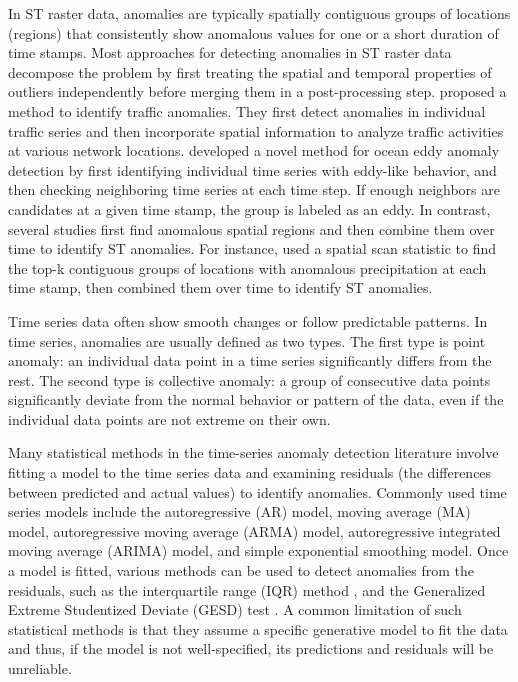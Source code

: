 \documentclass[11pt]{article}
\begin{document}
In ST raster data, anomalies are typically spatially contiguous groups of locations (regions) that consistently show anomalous values for one or a short duration of time stamps. Most approaches for detecting anomalies in ST raster data decompose the problem by first treating the spatial and temporal properties of outliers independently before merging them in a post-processing step. \citet{paschalidis2008spatio} proposed a method to identify traffic anomalies. They first detect anomalies in individual traffic series and then incorporate spatial information to analyze traffic activities at various network locations. \citet{faghmous2012novel} developed a novel method for ocean eddy anomaly detection by first identifying individual time series with eddy-like behavior, and then checking neighboring time series at each time step. If enough neighbors are candidates at a given time stamp, the group is labeled as an eddy. In contrast, several studies first find anomalous spatial regions and then combine them over time to identify ST anomalies. For instance, \citet{wu2010spatio} used a spatial scan statistic to find the top-k contiguous groups of locations with anomalous precipitation at each time stamp, then combined them over time to identify ST anomalies.





Time series data often show smooth changes or follow predictable patterns. In time series, anomalies are usually defined as two types. The first type is point anomaly: an individual data point in a time series significantly differs from the rest. The second type is collective anomaly: a group of consecutive data points significantly deviate from the normal behavior or pattern of the data, even if the individual data points are not extreme on their own. 

Many statistical methods in the time-series anomaly detection literature involve fitting a model to the time series data and examining residuals (the differences between predicted and actual values) to identify anomalies. Commonly used time series models include the autoregressive (AR) model, moving average (MA) model, autoregressive moving average (ARMA) model, autoregressive integrated moving average (ARIMA) model, and simple exponential smoothing model. Once a model is fitted, various methods can be used to detect anomalies from the residuals, such as the interquartile range (IQR) method \citep{IQR}, and the Generalized Extreme Studentized Deviate (GESD) test \citep{rosner1983percentage}. A common limitation of such statistical methods is that they assume a specific generative model to fit the data and thus, if the model is not well-specified, its predictions and residuals will be unreliable. 
\end{document}
